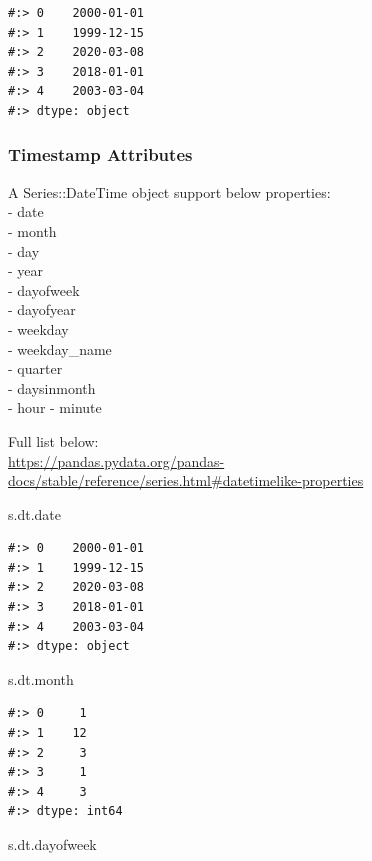 \documentclass[
]{book}
\newenvironment{Shaded}{\begin{snugshade}}{\end{snugshade}}
\newcommand{\NormalTok}[1]{#1}
\begin{document}
\begin{verbatim}
#:> 0    2000-01-01
#:> 1    1999-12-15
#:> 2    2020-03-08
#:> 3    2018-01-01
#:> 4    2003-03-04
#:> dtype: object
\end{verbatim}

\hypertarget{timestamp-attributes}{%
\subsubsection{Timestamp Attributes}\label{timestamp-attributes}}

A Series::DateTime object support below properties:\\
- date\\
- month\\
- day\\
- year\\
- dayofweek\\
- dayofyear\\
- weekday\\
- weekday\_name\\
- quarter\\
- daysinmonth\\
- hour - minute

Full list below:\\
\url{https://pandas.pydata.org/pandas-docs/stable/reference/series.html\#datetimelike-properties}

\begin{Shaded}
\begin{Highlighting}[]
\NormalTok{s.dt.date}
\end{Highlighting}
\end{Shaded}

\begin{verbatim}
#:> 0    2000-01-01
#:> 1    1999-12-15
#:> 2    2020-03-08
#:> 3    2018-01-01
#:> 4    2003-03-04
#:> dtype: object
\end{verbatim}

\begin{Shaded}
\begin{Highlighting}[]
\NormalTok{s.dt.month}
\end{Highlighting}
\end{Shaded}

\begin{verbatim}
#:> 0     1
#:> 1    12
#:> 2     3
#:> 3     1
#:> 4     3
#:> dtype: int64
\end{verbatim}

\begin{Shaded}
\begin{Highlighting}[]
\NormalTok{s.dt.dayofweek}
\end{Highlighting}
\end{Shaded}
\end{document}
